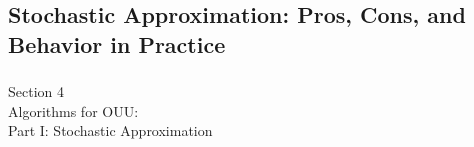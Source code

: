\documentclass[aspectratio=169,xcolor=dvipsnames,10pt]{beamer}
\begin{document}


\subsection{Stochastic Approximation: Pros, Cons, and Behavior in Practice}
\begin{frame}\frametitle{}
\begin{center}\Large
Section 4\\
Algorithms for OUU:\\
Part I: Stochastic Approximation
\end{center}
\end{frame}
\end{document}
